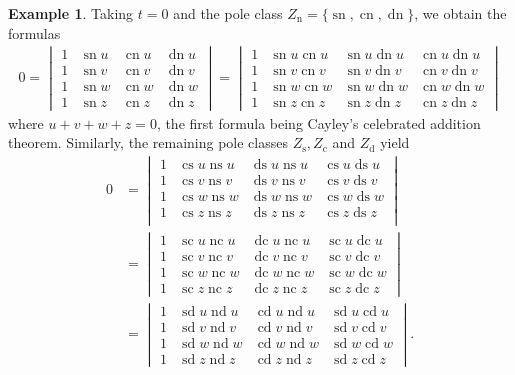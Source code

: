 \documentclass{amsart}
\theoremstyle{definition}
\newtheorem{example}[theorem]{Example}
\DeclareMathOperator{\ns}{ns}
\DeclareMathOperator{\nc}{nc}
\DeclareMathOperator{\dn}{dn}
\DeclareMathOperator{\ds}{ds}
\DeclareMathOperator{\cs}{cs}
\DeclareMathOperator{\sn}{sn}
\DeclareMathOperator{\cn}{cn}
\DeclareMathOperator{\nd}{nd}
\DeclareMathOperator{\scJ}{sc}
\DeclareMathOperator{\cd}{cd}
\DeclareMathOperator{\dc}{dc}
\DeclareMathOperator{\sd}{sd}
\DeclareMathOperator{\s}{s}
\DeclareMathOperator{\cJ}{c}
\DeclareMathOperator{\dJ}{d}
\DeclareMathOperator{\n}{n}
\begin{document}
\begin{example}
    Taking $t=0$ and the pole class $Z_{\n}=\{\sn,\cn,\dn\}$, we obtain the formulas
    \begin{align*}
        0=\begin{vmatrix}
1 & \sn u & \cn u & \dn u \\
1 & \sn v & \cn v & \dn v \\
1 & \sn w & \cn w & \dn w \\
1 & \sn z & \cn z & \dn z 
\end{vmatrix}=\begin{vmatrix}
1 & \sn u \cn u & \sn u \dn u & \cn u \dn u \\
1 & \sn v \cn v & \sn v \dn v & \cn v \dn v \\
1 & \sn w \cn w & \sn w \dn w & \cn w \dn w \\
1 & \sn z \cn z & \sn z \dn z & \cn z \dn z
\end{vmatrix}
    \end{align*}
where $u+v+w+z=0$, the first formula being Cayley's celebrated addition theorem. Similarly, the remaining pole classes $Z_{\s},Z_{\cJ}$ and $Z_{\dJ}$ yield
\begin{align*}
    0&=\begin{vmatrix}
1 & \cs u \ns u & \ds u \ns u & \cs u \ds u \\
1 & \cs v \ns v & \ds v \ns v & \cs v \ds v \\
1 & \cs w \ns w & \ds w \ns w & \cs w \ds w \\
1 & \cs z \ns z & \ds z \ns z & \cs z \ds z \\
\end{vmatrix}\\
&=\begin{vmatrix}
1 & \scJ u \nc u & \dc u \nc u & \scJ u \dc u \\
1 & \scJ v \nc v & \dc v \nc v & \scJ v \dc v \\
1 & \scJ w \nc w & \dc w \nc w & \scJ w \dc w \\
1 & \scJ z \nc z & \dc z \nc z & \scJ z \dc z 
\end{vmatrix}\\
&=\begin{vmatrix}
1 & \sd u \nd u & \cd u \nd u & \sd u \cd u \\
1 & \sd v \nd v & \cd v \nd v & \sd v \cd v \\
1 & \sd w \nd w & \cd w \nd w & \sd w \cd w \\
1 & \sd z \nd z & \cd z \nd z & \sd z \cd z 
\end{vmatrix}.

\end{align*}
\end{example}
\end{document}
